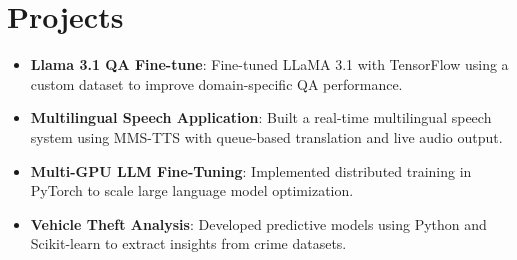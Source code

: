 \documentclass[letterpaper,11pt]{article}
\newcommand{\resumeItem}[2]{
  \item\small{
    \textbf{#1}{: #2 \vspace{-2pt}}
  }
}
\newcommand{\resumeSubItem}[2]{\resumeItem{#1}{#2}\vspace{-4pt}}
\newcommand{\resumeSubHeadingListStart}{\begin{itemize}[leftmargin=*, itemsep=0pt]}
\newcommand{\resumeSubHeadingListEnd}{\end{itemize}}
\begin{document}
\vspace{-0.75cm}

\section{Projects}
\resumeSubHeadingListStart  
  \resumeSubItem{Llama 3.1 QA Fine-tune}
    {Fine-tuned LLaMA 3.1 with TensorFlow using a custom dataset to improve domain-specific QA performance.}
  \resumeSubItem{Multilingual Speech Application}
    {Built a real-time multilingual speech system using MMS-TTS with queue-based translation and live audio output.}
  \resumeSubItem{Multi-GPU LLM Fine-Tuning}
    {Implemented distributed training in PyTorch to scale large language model optimization.}
  \resumeSubItem{Vehicle Theft Analysis}
    {Developed predictive models using Python and Scikit-learn to extract insights from crime datasets.}
\resumeSubHeadingListEnd
\end{document}
